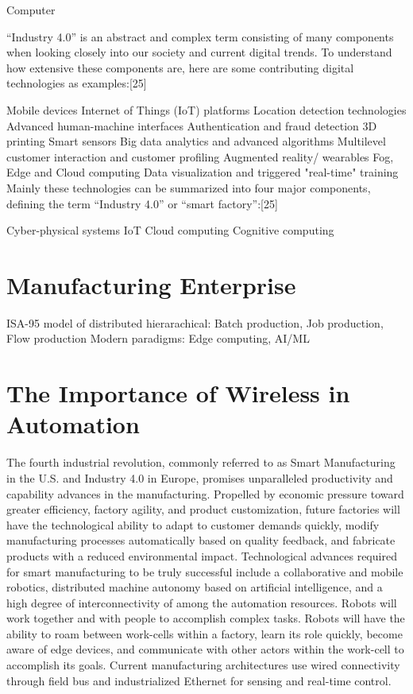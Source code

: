 \documentclass[english]{spimubphdthesis}
\begin{document}
Computer

“Industry 4.0” is an abstract and complex term consisting of many components when looking closely into our society and current digital trends. To understand how extensive these components are, here are some contributing digital technologies as examples:[25]

Mobile devices
Internet of Things (IoT) platforms
Location detection technologies
Advanced human-machine interfaces
Authentication and fraud detection
3D printing
Smart sensors
Big data analytics and advanced algorithms
Multilevel customer interaction and customer profiling
Augmented reality/ wearables
Fog, Edge and Cloud computing
Data visualization and triggered "real-time" training
Mainly these technologies can be summarized into four major components, defining the term “Industry 4.0” or “smart factory”:[25]

Cyber-physical systems
IoT
Cloud computing
Cognitive computing

\section{Manufacturing Enterprise}
ISA-95 model of distributed hierarachical: Batch production, Job production, Flow production
Modern paradigms: Edge computing, AI/ML


\section{The Importance of Wireless in Automation}

The fourth industrial revolution, commonly referred to as Smart Manufacturing in the U.S. and Industry 4.0 in Europe, promises unparalleled productivity and capability advances in the manufacturing.  Propelled by economic pressure toward greater efficiency, factory agility, and product customization, future factories will have the technological ability to adapt to customer demands quickly, modify manufacturing processes automatically based on quality feedback, and fabricate products with a reduced environmental impact.  Technological advances required for smart manufacturing to be truly successful include a collaborative and mobile robotics, distributed machine autonomy based on artificial intelligence, and a high degree of interconnectivity of among the automation resources.  Robots will work together and with people to accomplish complex tasks.  Robots will have the ability to roam between work-cells within a factory, learn its role quickly, become aware of edge devices, and communicate with other actors within the work-cell to accomplish its goals.  Current manufacturing architectures use wired connectivity through field bus and industrialized Ethernet for sensing and real-time control.  
\end{document}
